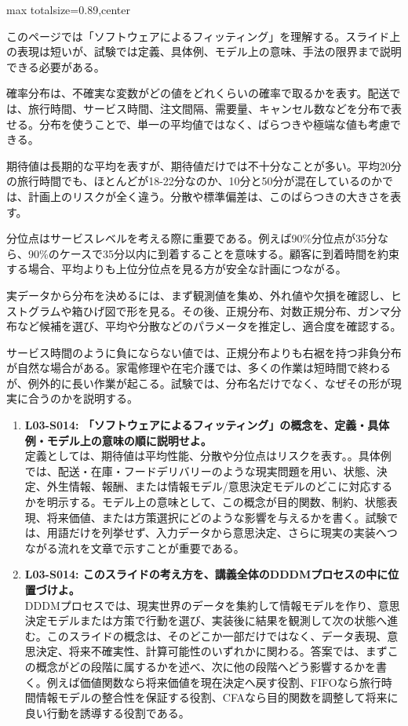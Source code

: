 \begin{minipage}[t]{0.58\textwidth}
\begin{adjustbox}{max totalsize={\textwidth}{0.89\textheight},center}
\begin{minipage}{\textwidth}\scriptsize
{}このページでは「ソフトウェアによるフィッティング」を理解する。スライド上の表現は短いが、試験では定義、具体例、モデル上の意味、手法の限界まで説明できる必要がある。\par
確率分布は、不確実な変数がどの値をどれくらいの確率で取るかを表す。配送では、旅行時間、サービス時間、注文間隔、需要量、キャンセル数などを分布で表せる。分布を使うことで、単一の平均値ではなく、ばらつきや極端な値も考慮できる。\par
期待値は長期的な平均を表すが、期待値だけでは不十分なことが多い。平均20分の旅行時間でも、ほとんどが18-22分なのか、10分と50分が混在しているのかでは、計画上のリスクが全く違う。分散や標準偏差は、このばらつきの大きさを表す。\par
分位点はサービスレベルを考える際に重要である。例えば90\%分位点が35分なら、90\%のケースで35分以内に到着することを意味する。顧客に到着時間を約束する場合、平均よりも上位分位点を見る方が安全な計画につながる。\par
実データから分布を決めるには、まず観測値を集め、外れ値や欠損を確認し、ヒストグラムや箱ひげ図で形を見る。その後、正規分布、対数正規分布、ガンマ分布など候補を選び、平均や分散などのパラメータを推定し、適合度を確認する。\par
サービス時間のように負にならない値では、正規分布よりも右裾を持つ非負分布が自然な場合がある。家電修理や在宅介護では、多くの作業は短時間で終わるが、例外的に長い作業が起こる。試験では、分布名だけでなく、なぜその形が現実に合うのかを説明する。\par{}\begin{enumerate}\item \textbf{L03-S014: 「ソフトウェアによるフィッティング」の概念を、定義・具体例・モデル上の意味の順に説明せよ。}\\定義としては、期待値は平均性能、分散や分位点はリスクを表す。。具体例では、配送・在庫・フードデリバリーのような現実問題を用い、状態、決定、外生情報、報酬、または情報モデル/意思決定モデルのどこに対応するかを明示する。モデル上の意味として、この概念が目的関数、制約、状態表現、将来価値、または方策選択にどのような影響を与えるかを書く。試験では、用語だけを列挙せず、入力データから意思決定、さらに現実の実装へつながる流れを文章で示すことが重要である。\item \textbf{L03-S014: このスライドの考え方を、講義全体のDDDMプロセスの中に位置づけよ。}\\DDDMプロセスでは、現実世界のデータを集約して情報モデルを作り、意思決定モデルまたは方策で行動を選び、実装後に結果を観測して次の状態へ進む。このスライドの概念は、そのどこか一部だけではなく、データ表現、意思決定、将来不確実性、計算可能性のいずれかに関わる。答案では、まずこの概念がどの段階に属するかを述べ、次に他の段階へどう影響するかを書く。例えば価値関数なら将来価値を現在決定へ戻す役割、FIFOなら旅行時間情報モデルの整合性を保証する役割、CFAなら目的関数を調整して将来に良い行動を誘導する役割である。\end{enumerate}

\end{minipage}
\end{adjustbox}
\end{minipage}
